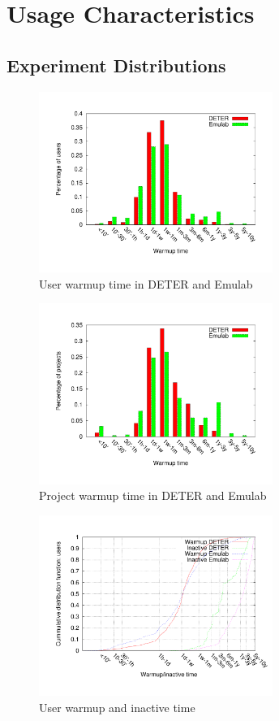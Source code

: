 \section{Usage Characteristics}
\label{sec:character}


\subsection{Experiment Distributions} 
\begin{figure}[htbp] \begin{center}
\includegraphics[width=3in]{figs/warmup_user.pdf} 
\caption{User warmup time in DETER and Emulab} 
\label{warmupus} \end{center} \end{figure}

\begin{figure}[htbp] \begin{center}
\includegraphics[width=3in]{figs/warmup_proj.pdf} 
\caption{Project warmup time in DETER and Emulab} \label{warmuppr} \end{center}
\end{figure}


\begin{figure}[htbp] \begin{center}
\includegraphics[width=3in]{figs/warmup_inact_user.pdf} 
\caption{User warmup and inactive time} \label{warmupinus} \end{center} \end{figure}


